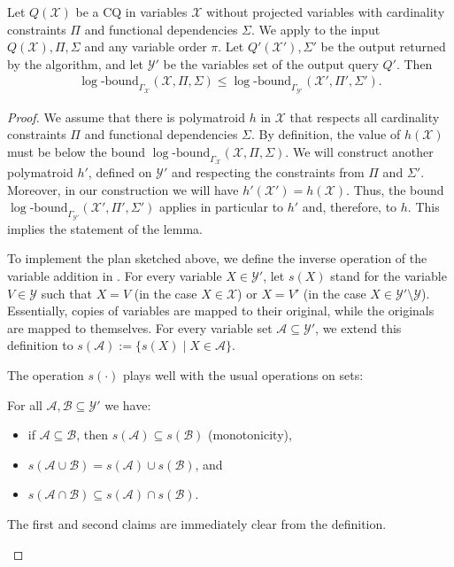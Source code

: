 \documentclass[a4paper,cleveref]{lipics-v2021}
\newcommand{\logb}{\mathrm{\log\text{-}bound}}
\newcommand{\vset}[1]{\mathcal{#1}}
\begin{document}
\begin{proposition}
	Let $Q(\vset X)$ be a CQ in variables $\vset X$ without projected variables with cardinality constraints $\Pi$ and functional dependencies $\Sigma$. 
	We apply   to the input $Q(\vset X), \Pi, \Sigma$  and any variable order $\pi$.
	Let $Q'(\vset X'), \Sigma'$ be the output returned by the algorithm,
	and let $\vset Y'$ be the variables set of the output query $Q'$. Then 
	\begin{align*}
		\logb_{\Gamma_{\vset X}}(\vset X, \Pi, \Sigma) \le \logb_{\Gamma_{\vset Y'}}(\vset X', \Pi', \Sigma').
	\end{align*}
\end{proposition}
\begin{proof}
	We assume that there is polymatroid $h$  in $\vset X$ that respects all cardinality constraints $\Pi$ and functional dependencies $\Sigma$. 
	By definition, the value of $h({\vset X})$ must be below the bound %
	$\logb_{\Gamma_{\vset X}}(\vset X, \Pi, \Sigma)$. 
	We will construct another polymatroid $h'$, defined on ${\vset Y}'$ and respecting the constraints from $\Pi$ and $\Sigma'$. 
	Moreover, in our construction we will have $h'({\vset X}') = h({\vset X})$.
	Thus, the bound $\logb_{\Gamma_{\vset Y'}}(\vset X', \Pi', \Sigma')$ applies in particular to $h'$ and, therefore, to $h$. This implies the statement of the lemma.
	
	To implement the plan sketched above,  
	we define the inverse operation of the variable addition in . For every variable $X\in \vset Y'$, let $s(X)$ stand for the variable $V\in \vset Y$ such that 
	 $X=V$ (in the case $X\in \vset X$) or $X= V' $  (in the case $X\in  \vset Y'\setminus \vset Y$). Essentially, copies of variables are mapped to their original, while the originals are mapped to themselves.
	 For every variable set $\vset A\subseteq \vset Y'$, we extend this definition to $s(\vset A):= \{s(X)\mid X\in \vset A\}$.
	
	The operation $s(\cdot)$ plays well with the usual operations on sets:
	\begin{claim}
		For all $\vset A,\vset B\subseteq \vset Y'$ we have:
		\begin{itemize}
			\item if $\vset A\subseteq \vset B$, then $s(\vset A)\subseteq s(\vset B)$ (monotonicity),
			\item $s(\vset A\cup \vset B) = s(\vset A)\cup s(\vset B)$, and
			\item $s(\vset A\cap \vset B)\subseteq s(\vset A)\cap s(\vset B)$.
		\end{itemize}
	\end{claim}
	\begin{claimproof}
		The first and second claims are immediately clear from the definition.
		

\end{claimproof}
\end{proof}
\end{document}
